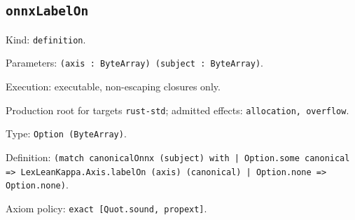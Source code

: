 \documentclass[11pt]{article}
\begin{document}
\subsection*{\texttt{onnxLabelOn}}
\noindent Kind: \texttt{definition}.\par
\noindent Parameters: \texttt{(axis : ByteArray) (subject : ByteArray)}.\par
\noindent Execution: executable, non-escaping closures only.\par
\noindent Production root for targets \texttt{rust-std}; admitted effects: \texttt{allocation, overflow}.\par
\noindent Type: \texttt{Option (ByteArray)}.\par
\noindent Definition: \texttt{(match canonicalOnnx (subject) with | Option.some canonical => LexLeanKappa.Axis.labelOn (axis) (canonical) | Option.none => Option.none)}.\par
\noindent Axiom policy: \texttt{exact [Quot.sound, propext]}.\par
\end{document}
